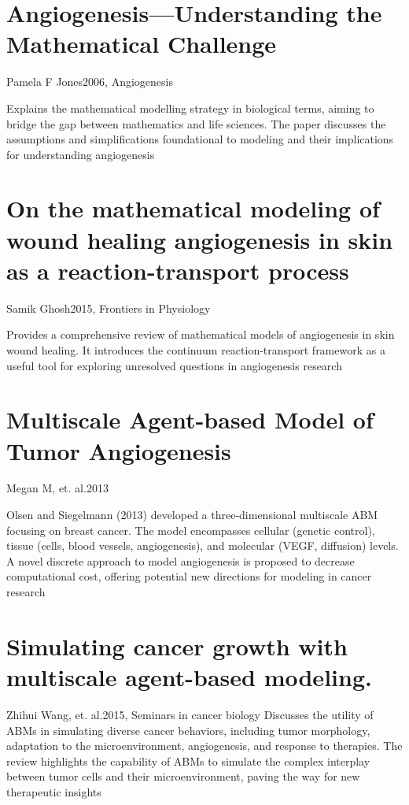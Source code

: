 \section{Angiogenesis—Understanding the Mathematical Challenge}{Pamela F Jones}{2006, Angiogenesis}

Explains the mathematical modelling strategy in biological terms, aiming to bridge the gap between mathematics and life sciences. The paper discusses the assumptions and simplifications foundational to modeling and their implications for understanding angiogenesis \cite{Jones2006}

\section{On the mathematical modeling of wound healing angiogenesis in skin as a reaction-transport process}{Samik Ghosh}{2015, Frontiers in Physiology}

Provides a comprehensive review of mathematical models of angiogenesis in skin wound healing. It introduces the continuum reaction-transport framework as a useful tool for exploring unresolved questions in angiogenesis research \cite{Ghosh2015} 

\section{Multiscale Agent-based Model of Tumor Angiogenesis}{Megan M, et. al.}{2013}

Olsen and Siegelmann (2013) developed a three-dimensional multiscale ABM focusing on breast cancer. The model encompasses cellular (genetic control), tissue (cells, blood vessels, angiogenesis), and molecular (VEGF, diffusion) levels. A novel discrete approach to model angiogenesis is proposed to decrease computational cost, offering potential new directions for modeling in cancer research \cite{Olsen2013}

\section{Simulating cancer growth with multiscale agent-based modeling.}{Zhihui Wang, et. al.}{2015, Seminars in cancer biology}
Discusses the utility of ABMs in simulating diverse cancer behaviors, including tumor morphology, adaptation to the microenvironment, angiogenesis, and response to therapies. The review highlights the capability of ABMs to simulate the complex interplay between tumor cells and their microenvironment, paving the way for new therapeutic insights \cite{Wang2015}

